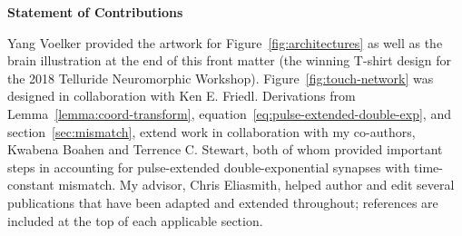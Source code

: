 \cleardoublepage

\begin{center}\textbf{Statement of Contributions}\end{center}

\noindent
Yang Voelker provided the artwork for Figure~\ref{fig:architectures} as well as the brain illustration at the end of this front matter (the winning T-shirt design for the 2018 Telluride Neuromorphic Workshop).
Figure~\ref{fig:touch-network} was designed in collaboration with Ken E. Friedl.
Derivations from Lemma~\ref{lemma:coord-transform}, equation~\ref{eq:pulse-extended-double-exp}, and section~\ref{sec:mismatch}, extend work in collaboration with my co-authors, Kwabena Boahen and Terrence C. Stewart, both of whom provided important steps in accounting for pulse-extended double-exponential synapses with time-constant mismatch.
My advisor, Chris Eliasmith, helped author and edit several publications that have been adapted and extended throughout; references are included at the top of each applicable section.

\cleardoublepage
